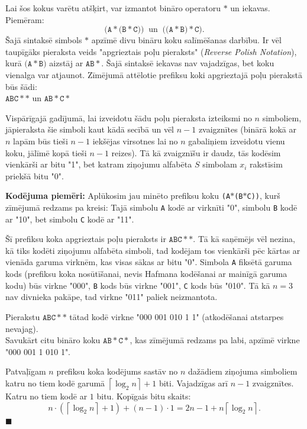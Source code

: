 \documentclass[11pt]{article}
\begin{document}
Lai šos kokus varētu atšķirt, var izmantot bināro operatoru $\ast$ un iekavas. Piemēram: 
$$\mathtt{(A}\ast\mathtt{(B}\ast\mathtt{C))}\;\;\text{un}\;\;\mathtt{((A}\ast\mathtt{B)}\ast\mathtt{C)}.$$
Šajā sintaksē simbols $\ast$ apzīmē divu bināru koku salīmēšanas darbību. 
Ir vēl taupīgāks pieraksta veids \textendash{} "apgrieztais poļu pieraksts"
({\em Reverse Polish Notation}), kurā 
$\mathtt{(A}\ast\mathtt{B)}$ aizstāj ar $\mathtt{AB}\ast$. Šajā sintaksē iekavas nav vajadzīgas, 
bet koku vienalga var atjaunot. 
Zīmējumā attēlotie prefiksu koki apgrieztajā poļu pierakstā būs šādi:\\
$\mathtt{ABC}\ast\ast$ un $\mathtt{AB}\ast\mathtt{C}\ast$

Vispārīgajā gadījumā, lai izveidotu šādu poļu pieraksta izteiksmi no $n$ simboliem, 
jāpieraksta šie simboli kaut kādā secībā un vēl $n-1$ zvaigznītes (binārā kokā 
ar $n$ lapām būs tieši $n-1$ iekšējas virsotnes \textendash{} lai no $n$ gabaliņiem izveidotu 
vienu koku, jālīmē kopā tieši $n-1$ reizes). 
Tā kā zvaigznīšu ir daudz, tās kodēsim vienkārši ar
bitu "1", bet katram ziņojumu alfabēta $S$ simbolam $x_i$ rakstīsim priekšā 
bitu "0".

{\bf Kodējuma piemēri:} Aplūkosim jau minēto
prefiksu koku {\tt (A$\ast$(B$\ast$C))}, kurš zīmējumā redzams pa kreisi: Tajā simbolu {\tt A} kodē ar 
virknīti "0", simbolu {\tt B} kodē ar "10", bet simbolu {\tt C} kodē ar "11".

Šī prefiksu koka apgrieztais poļu pieraksts ir $\mathtt{ABC}\ast\ast$. 
Tā kā saņēmējs vēl nezina, kā tiks kodēti ziņojumu alfabēta simboli,
tad kodējam tos vienkārši pēc kārtas ar vienāda garuma 
virknēm, kas visas sākas ar bitu "0". 
Simbola {\tt A} fiksētā garuma kods (prefiksu koka nosūtīšanai, 
nevis Hafmana kodēšanai ar mainīgā garuma kodu) būs 
virkne "000", {\tt B} kods būs virkne "001", 
{\tt C} kods būs "010". Tā kā $n=3$ nav divnieka pakāpe, tad virkne "011" paliek neizmantota. 

Pierakstu $\mathtt{ABC}\ast\ast$ tātad kodē virkne "000 001 010 1 1" (atkodēšanai atstarpes nevajag).\\
Savukārt citu bināro koku $\mathtt{AB}\ast\mathtt{C}\ast$, kas zīmējumā redzams pa labi, 
apzīmē virkne "000 001 1 010 1".

Patvaļīgam $n$ prefiksu koka kodējums sastāv no $n$ dažādiem ziņojuma simboliem \textendash{} katru 
no tiem kodē garumā $\left\lceil \log_2 n \right\rceil + 1$ biti. Vajadzīgas arī $n-1$ 
zvaigznītes. Katru no tiem kodē ar $1$ bitu. Kopīgais bitu skaits:
$$n\cdot\left( \left\lceil \log_2 n \right\rceil + 1 \right) + 
(n-1)\cdot{}1 = 2n-1 + n \left\lceil \log_2 n \right\rceil.$$
$\blacksquare$
\end{document}
